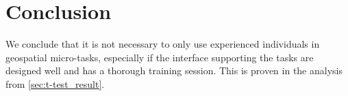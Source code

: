 \chapter{Conclusion}

We conclude that it is not necessary to only use experienced individuals in geospatial micro-tasks, especially if the interface supporting the tasks are designed well and has a thorough training session. This is proven in the analysis from \ref{sec:t-test_result}. 